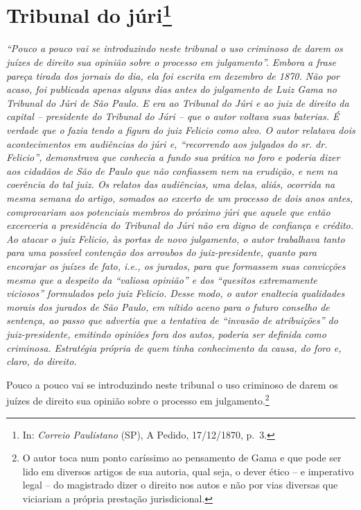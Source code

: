 {\chapter{Tribunal do júri\footnote{ In: \emph{Correio Paulistano} (SP), A Pedido, 17/12/1870,
  p.~3.}} %

\begin{didascalia}
\emph{``Pouco a pouco vai se introduzindo neste tribunal o uso criminoso
de darem os juízes de direito sua opinião sobre o processo em
julgamento''. Embora a frase pareça tirada dos jornais do dia, ela foi
escrita em dezembro de 1870. Não por acaso, foi publicada apenas alguns
dias antes do julgamento de Luiz Gama no Tribunal do Júri de São Paulo.
E era ao Tribunal do Júri e ao juiz de direito da capital -- presidente
do Tribunal do Júri -- que o autor voltava suas baterias. É verdade que
o fazia tendo a figura do juiz Felicio como alvo. O autor relatava dois
acontecimentos em audiências do júri e, ``recorrendo aos julgados do sr.
dr. Felicio'', demonstrava que conhecia a fundo sua prática no foro e
poderia dizer aos cidadãos de São de Paulo que não confiassem nem na
erudição, e nem na coerência do tal juiz. Os relatos das audiências, uma
delas, aliás, ocorrida na mesma semana do artigo, somados ao excerto de
um processo de dois anos antes, comprovariam aos potenciais membros do
próximo júri que aquele que então excerceria a presidência do Tribunal
do Júri não era digno de confiança e crédito. Ao atacar o juiz Felicio,
às portas de novo julgamento, o autor trabalhava tanto para uma possível
contenção dos arroubos do juiz-presidente, quanto para encorajar os
juízes de fato, i.e., os jurados, para que formassem suas convicções
mesmo que a despeito da ``valiosa opinião'' e dos ``quesitos extremamente
viciosos'' formulados pelo juiz Felicio. Desse modo, o autor enaltecia
qualidades morais dos jurados de São Paulo, em nítido aceno para o
futuro conselho de sentença, ao passo que advertia que a tentativa de
``invasão de atribuições'' do juiz-presidente, emitindo opiniões fora dos
autos, poderia ser definida como criminosa. Estratégia própria de quem
tinha conhecimento da causa, do foro e, claro, do direito.}
\end{didascalia}

\asterisc{}

Pouco a pouco vai se introduzindo neste tribunal o uso criminoso de
darem os juízes de direito sua opinião sobre o processo em
julgamento.\footnote{ O autor toca num ponto caríssimo ao pensamento de
  Gama e que pode ser lido em diversos artigos de sua autoria, qual
  seja, o dever ético -- e imperativo legal -- do magistrado dizer o
  direito nos autos e não por vias diversas que viciariam a própria
  prestação jurisdicional.}

}
